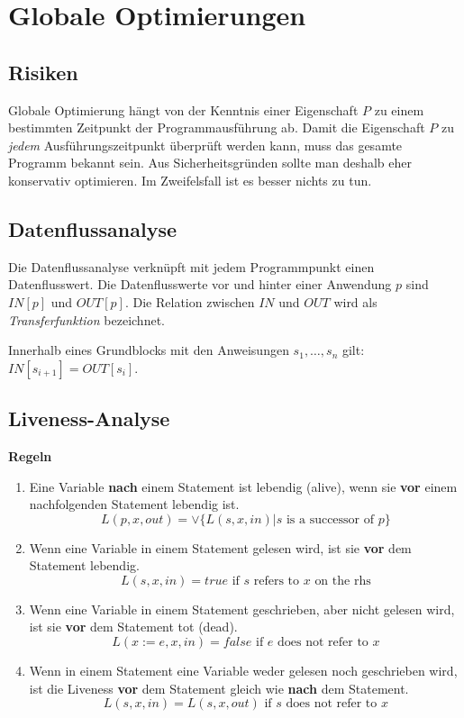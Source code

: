 \section{Globale Optimierungen}


\subsection{Risiken}

Globale Optimierung hängt von der Kenntnis einer Eigenschaft $P$ zu einem
bestimmten Zeitpunkt der Programmausführung ab. Damit die Eigenschaft $P$ zu
\textit{jedem} Ausführungszeitpunkt überprüft werden kann, muss das gesamte
Programm bekannt sein. Aus Sicherheitsgründen sollte man deshalb eher
konservativ optimieren. Im Zweifelsfall ist es besser nichts zu tun.


\subsection{Datenflussanalyse}

Die Datenflussanalyse verknüpft mit jedem Programmpunkt einen Datenflusswert.
Die Datenflusswerte vor und hinter einer Anwendung $p$ sind $IN[p]$ und
$OUT[p]$. Die Relation zwischen $IN$ und $OUT$ wird als
\textit{Transferfunktion} bezeichnet.

Innerhalb eines Grundblocks mit den Anweisungen $s_1,\ldots,s_n$ gilt:
$IN[s_{i+1}] = OUT[s_i]$.


\subsection{Liveness-Analyse}

\textbf{Regeln}

\begin{enumerate}
	\item Eine Variable \textbf{nach} einem Statement ist lebendig (alive), wenn
		sie \textbf{vor} einem nachfolgenden Statement lebendig ist.\\
		\[ L(p, x, out) = \lor \{ L(s, x, in) | s \textrm{ is a successor of } p \} \]
	\item Wenn eine Variable in einem Statement gelesen wird, ist sie \textbf{vor}
		dem Statement lebendig.\\
		\[ L(s, x, in) = true \textrm{ if } s \textrm{ refers to } x \textrm{ on the rhs} \]
	\item Wenn eine Variable in einem Statement geschrieben, aber nicht gelesen
		wird, ist sie \textbf{vor} dem Statement tot (dead).\\
		\[ L(x := e, x, in) = false \textrm{ if } e \textrm{ does not refer to } x \]
	\item Wenn in einem Statement eine Variable weder gelesen noch geschrieben
		wird, ist die Liveness \textbf{vor} dem Statement gleich wie \textbf{nach}
		dem Statement.\\
		\[ L(s, x, in) = L(s, x, out) \textrm{ if } s \textrm{ does not refer to } x \]
\end{enumerate}

